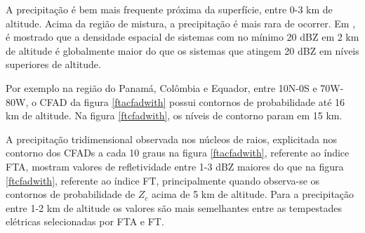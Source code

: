 A precipitação é bem mais frequente próxima da superfície, entre 0-3 km de altitude. Acima da região de mistura, a precipitação é mais rara de ocorrer. Em \cite{liu2008}, é mostrado que a densidade espacial de sistemas com no mínimo 20 dBZ em 2 km de altitude é globalmente maior do que os sistemas que atingem 20 dBZ em níveis superiores de altitude.



Por exemplo na região do Panamá, Colômbia e Equador, entre 10N-0S e 70W-80W, o CFAD da figura \ref{ftacfadwith} possui contornos de probabilidade até 16 km de altitude. Na figura \ref{ftcfadwith}, os níveis de contorno param em 15 km.

A precipitação tridimensional observada nos núcleos de raios, explicitada nos contorno dos CFADs a cada 10 graus na figura \ref{ftacfadwith}, referente ao índice FTA, mostram valores de refletividade entre 1-3 dBZ maiores do que na figura \ref{ftcfadwith}, referente ao índice FT, principalmente quando observa-se os contornos de probabilidade de $Z_c$ acima de 5 km de altitude. Para a precipitação entre 1-2 km de altitude os valores são mais semelhantes entre as tempestades elétricas selecionadas por FTA e FT. 


